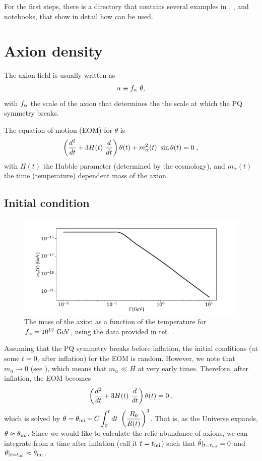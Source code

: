 \documentclass[11pt,a4paper]{article}
\begin{document}
For the first steps, there is a directory that contains several examples in \CPP, \PY, and \JUPY notebooks, that show in detail how \mimes can be used.


\section{Axion density}\label{sec:density}
\setcounter{equation}{0}
%
The axion field is usually written as 
%
\begin{equation}
	\alpha  \equiv f_{\alpha}{} \ \theta,
	\label{eq:fa_def}
\end{equation}
%
with $f_{\alpha}{}$ the scale of the axion that determines the the scale at which the PQ symmetry breaks. 

The equation of motion (EOM) for $\theta$ is 
%
\begin{equation}
	\lrb{\dfrac{d^2}{d t} + 3 H(t) \ \dfrac{d}{d t} } \theta(t) + m_{\alpha}^2(t) \ \sin \theta(t) = 0 \; ,
	\label{eq:eom}
\end{equation}
%
with $H(t)$ the Hubble parameter (determined by the cosmology), and $m_{\alpha}(t)$  the time (temperature) dependent mass of the axion. 

\subsection*{Initial condition}
%
\begin{figure}[h!]
	\includegraphics[width=1\textwidth]{figs/axion_mass.pdf}
	\caption{The mass of the axion as a function of the temperature for $f_{\alpha}{}=10^{12}~{\rm GeV}$, using the data provided in ref.~\cite{Borsanyi:2016ksw}.}
	\label{fig:axion_mass}
\end{figure}
%
Assuming that the PQ symmetry breaks before inflation, the initial conditions (\ie at some $t=0$, after inflation) for the EOM is random. However, we note that $m_{\alpha} \to 0$ (see ), which means that $m_{\alpha} \ll H$ at very early times. Therefore, after inflation, the EOM becomes
%
\begin{equation}
	\left( \dfrac{d^2}{d t} + 3 H(t) \ \dfrac{d}{d t}   \right) \theta(t) = 0 \; ,
	\label{eq:massless_eom}
\end{equation}
%
which is solved by $\theta = \theta_{\rm ini}{} + C \displaystyle \int_{0}^t d t \ \left(  \dfrac{R_{0}}{R(t)}  \right)^3$. That is, as the Universe expands, $\theta \approx \theta_{\rm ini}{}$. Since we would like to calculate the relic abundance of axions, we can integrate  from a time after inflation (call it $t = t_{\rm ini}{}$) such that $ \dot \theta |_{t=t_{\rm ini}{}} = 0$ and  $\theta|_{t=t_{\rm ini}{}} \approx \theta_{\rm ini}{}$.   
\end{document}
